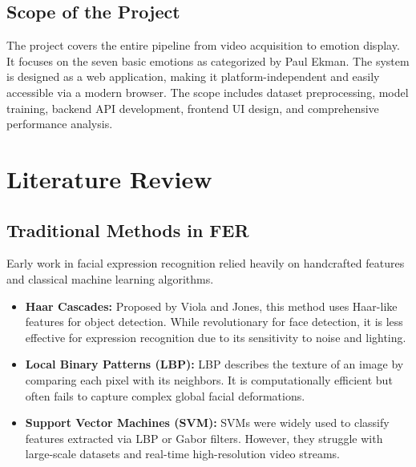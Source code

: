 \documentclass[12pt,a4paper]{report}
\begin{document}
\section{Scope of the Project}
The project covers the entire pipeline from video acquisition to emotion display. It focuses on the seven basic emotions as categorized by Paul Ekman. The system is designed as a web application, making it platform-independent and easily accessible via a modern browser. The scope includes dataset preprocessing, model training, backend API development, frontend UI design, and comprehensive performance analysis.

\clearpage

\chapter{Literature Review}

\section{Traditional Methods in FER}
Early work in facial expression recognition relied heavily on handcrafted features and classical machine learning algorithms.
\begin{itemize}
    \item \textbf{Haar Cascades:} Proposed by Viola and Jones, this method uses Haar-like features for object detection. While revolutionary for face detection, it is less effective for expression recognition due to its sensitivity to noise and lighting.
    \item \textbf{Local Binary Patterns (LBP):} LBP describes the texture of an image by comparing each pixel with its neighbors. It is computationally efficient but often fails to capture complex global facial deformations.
    \item \textbf{Support Vector Machines (SVM):} SVMs were widely used to classify features extracted via LBP or Gabor filters. However, they struggle with large-scale datasets and real-time high-resolution video streams.
\end{itemize}
\end{document}
